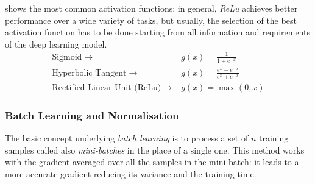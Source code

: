  shows the most common activation functions: in general, \textit{ReLu}  achieves better performance over a wide variety of tasks, but usually, the selection of the best activation function has to be done starting from all information and requirements of the deep learning model.
\begin{equation}\label{eq:activation}
	\begin{aligned}
		\text{Sigmoid} \;\rightarrow\;                      & g(x) = \frac{1}{1+ e^{-x}}           \\
		\text{Hyperbolic Tangent} \;\rightarrow\;           & g(x) = \frac{e^x-e^{-x}}{e^x+e^{-x}} \\
		\text{Rectified Linear Unit (ReLu)} \;\rightarrow\; & g(x) = \max(0,x)
	\end{aligned}
\end{equation}

\subsubsection{Batch Learning and Normalisation}
The basic concept underlying \textit{batch learning} \cite{stanford2019cs231n} is to process a set of $n$ training samples called also \textit{mini-batches} in the place of a single one.
This method works with the gradient averaged over all the samples in the mini-batch: it leads to a more accurate gradient reducing its variance and the training time.

